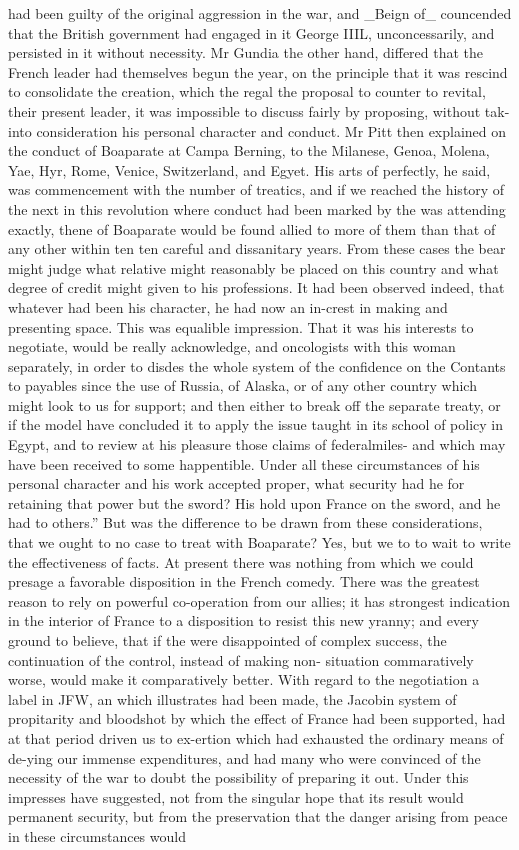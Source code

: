 had been guilty of the original aggression in the war, and \_Beign of\_ councended that the British government had engaged in it George IIIL, unconcessarily, and persisted in it without necessity. Mr Gundia the other hand, differed that the French leader had themselves begun the year, on the principle that it was rescind to consolidate the creation, which the regal the proposal to counter to revital, their present leader, it was impossible to discuss fairly by proposing, without tak- into consideration his personal character and conduct. Mr Pitt then explained on the conduct of Boaparate at Campa Berning, to the Milanese, Genoa, Molena, Yae, Hyr, Rome, Venice, Switzerland, and Egyet. His arts of perfectly, he said, was commencement with the number of treatics, and if we reached the history of the next in this revolution where conduct had been marked by the was attending exactly, thene of Boaparate would be found allied to more of them than that of any other within ten ten careful and dissanitary years. From these cases the bear might judge what relative might reasonably be placed on this country and what degree of credit might given to his professions. It had been observed indeed, that whatever had been his character, he had now an in-crest in making and presenting space. This was equalible impression. That it was his interests to negotiate, would be really acknowledge, and oncologists with this woman separately, in order to disdes the whole system of the confidence on the Contants to payables since the use of Russia, of Alaska, or of any other country which might look to us for support; and then either to break off the separate treaty, or if the model have concluded it to apply the issue taught in its school of policy in Egypt, and to review at his pleasure those claims of federalmiles- and which may have been received to some happentible. Under all these circumstances of his personal character and his work accepted proper, what security had he for retaining that power but the sword? His hold upon France on the sword, and he had to others.” But was the difference to be drawn from these considerations, that we ought to no case to treat with Boaparate? Yes, but we to to wait to write the effectiveness of facts. At present there was nothing from which we could presage a favorable disposition in the French comedy. There was the greatest reason to rely on powerful co-operation from our allies; it has strongest indication in the interior of France to a disposition to resist this new yranny; and every ground to believe, that if the were disappointed of complex success, the continuation of the control, instead of making non- situation commaratively worse, would make it comparatively better. With regard to the negotiation a label in JFW, an which illustrates had been made, the Jacobin system of propitarity and bloodshot by which the effect of France had been supported, had at that period driven us to ex-ertion which had exhausted the ordinary means of de-ying our immense expenditures, and had many who were convinced of the necessity of the war to doubt the possibility of preparing it out. Under this impresses have suggested, not from the singular hope that its result would permanent security, but from the preservation that the danger arising from peace in these circumstances would 